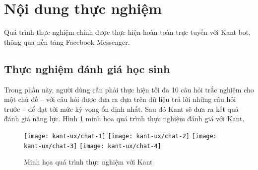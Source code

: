 \section{Nội dung thực nghiệm}
Quá trình thực nghiệm chính được thực hiện hoàn toàn trực tuyến với Kant bot, thông qua nền tảng Facebook Messenger.\par

\subsection{Thực nghiệm đánh giá học sinh}
Trong phần này, người dùng cần phải thực hiện tối đa 10 câu hỏi trắc nghiệm cho một chủ đề – với câu hỏi được đưa ra dựa trên dữ liệu trả lời những câu hỏi trước – để đạt tới mức kỳ vọng ổn định nhất. Sau đó Kant sẽ đưa ra kết quả đánh giá năng lực. Hình \ref{fig:fig-c4-chatbot-demo} minh họa quá trình thực nghiệm đánh giá với Kant.
\begin{figure}[htb!]\centering
	\texttt{[image: kant-ux/chat-1]}
	\texttt{[image: kant-ux/chat-2]}
	\texttt{[image: kant-ux/chat-3]}
	\texttt{[image: kant-ux/chat-4]}
	\caption{Minh họa quá trình thực nghiệm với Kant}
	\label{fig:fig-c4-chatbot-demo}
\end{figure}\par

